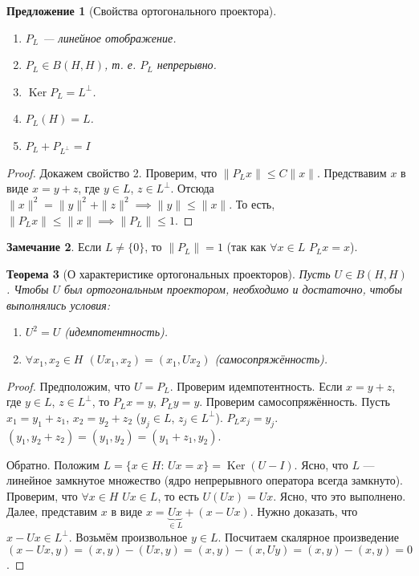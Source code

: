 \documentclass[11pt,openany,a4paper]{scrartcl}
\theoremstyle{plain}
\newtheorem{theorem}{Теорема}[subsection]
\newtheorem{proposition}[theorem]{Предложение}
\theoremstyle{definition}
\newtheorem{remark}[theorem]{Замечание}
\DeclareMathOperator{\Ker}{Ker}
\begin{document}
\begin{proposition}[Свойства ортогонального проектора]
\mbox{}
    \begin{enumerate}
        \item $P_L$ — линейное отображение.
        \item $P_L \in B(H, H)$, т. е. $P_L$ непрерывно.
        \item $\Ker P_L = L^\perp$.
        \item $P_L(H) = L$.
        \item $P_L + P_{L^\perp} = I$
    \end{enumerate}
\end{proposition}
\begin{proof}
        Докажем свойство 2. Проверим, что $\|P_Lx\| \leqslant C\|x\|$. Предствавим $x$ в виде
        $x = y + z$, где $y \in L$, $z \in L^\perp$. Отсюда
        $\|x\|^2 = \|y\|^2 + \|z\|^2 \implies \|y\| \leqslant \|x\|$. То есть,
        $\|P_Lx\| \leqslant \|x\| \implies \|P_L\| \leqslant 1$.
\end{proof}
\begin{remark}
    Если $L \neq \{0\}$, то $\|P_L\| = 1$ (так как $\forall x \in L$ $P_Lx = x$).
\end{remark}

\begin{theorem}[О характеристике ортогональных проекторов]
    Пусть $U \in B(H, H)$. Чтобы $U$ был ортогональным проектором,
    необходимо и достаточно, чтобы выполнялись условия:
    \begin{enumerate}
        \item $U^2 = U$ (идемпотентность).
        \item $\forall x_1, x_2 \in H$ $(Ux_1, x_2) = (x_1, Ux_2)$
        (самосопряжённость).
    \end{enumerate}
\end{theorem}
\begin{proof}
    Предположим, что $U = P_L$. Проверим идемпотентность.
    Если $x = y + z$, где $y \in L$, $z \in L^\perp$, то $P_Lx = y$, $P_Ly = y$.
    Проверим самосопряжённость. Пусть $x_1 = y_1 + z_1$, $x_2 = y_2 + z_2$
    ($y_j \in L$, $z_j \in L^\perp$). $P_Lx_j = y_j$.
    $(y_1, y_2 + z_2) = (y_1, y_2) = (y_1 + z_1, y_2)$.
    
    Обратно. Положим $L = \{x\in H:\, Ux=x\} = \Ker(U-I)$. Ясно, что $L$ — 
    линейное замкнутое множество (ядро непрерывного оператора всегда 
    замкнуто). Проверим, что $\forall x\in H$ $Ux \in L$, то есть $U(Ux) = Ux$.
    Ясно, что это выполнено. Далее, представим $x$ в виде
    $x = \underbrace{Ux}_{\in L} + (x - Ux)$. Нужно доказать, что
    $x - Ux \in L^\perp$. Возьмём произвольное $y \in L$. Посчитаем скалярное 
    произведение $(x - Ux, y) = (x, y) - (Ux, y) = (x, y) - (x, Uy) =
    (x, y) - (x, y) = 0$.
\end{proof}
\end{document}

